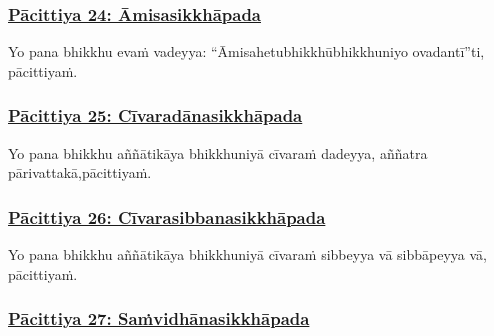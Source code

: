 \subsubsection*{\hyperref[exp24]{Pācittiya 24: Āmisasikkhāpada}}
\label{pac24}

Yo pana bhikkhu evaṁ vadeyya: ``Āmisahetu\makeatletter\hyperlink{endnote268-appendix}\makeatother \thinspace  bhikkhū\makeatletter\hyperlink{endnote269-appendix}\makeatother \thinspace bhikkhuniyo ovadantī''ti, pācittiyaṁ.



\subsubsection*{\hyperref[exp25]{Pācittiya 25: Cīvaradānasikkhāpada}}
\label{pac25}

Yo pana bhikkhu aññātikāya bhikkhuniyā cīvaraṁ dadeyya, aññatra pārivattakā,\makeatletter\hyperlink{endnote270-appendix}\makeatother \thinspace pācittiyaṁ.



\subsubsection*{\hyperref[exp26]{Pācittiya 26: Cīvarasibbanasikkhāpada}}
\label{pac26}

Yo pana bhikkhu aññātikāya bhikkhuniyā cīvaraṁ sibbeyya vā sibbāpeyya vā, pācittiyaṁ.



\subsubsection*{\hyperref[exp27]{Pācittiya 27: Saṁvidhānasikkhāpada}}
\label{pac27}


